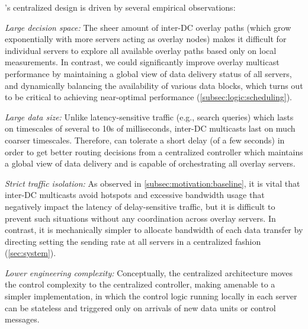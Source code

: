 \name's centralized design is driven by several empirical observations:
\begin{packedenumerate}

\item {\em Large decision space:}
The sheer amount of inter-DC overlay paths (which grow exponentially
with more servers acting as overlay nodes) makes it difficult for 
individual servers to explore all available overlay paths based only 
on local measurements. In contrast, we could significantly improve 
overlay multicast performance by maintaining a global view of data 
delivery status of all servers, and dynamically balancing the 
availability of various data blocks, which turns out to be critical 
to achieving near-optimal performance 
(\Section\ref{subsec:logic:scheduling}).

\item {\em Large data size:}
Unlike latency-sensitive traffic (e.g., search queries) which lasts 
on timescales of several to 10s of milliseconds, inter-DC multicasts 
last on much coarser timescales.
Therefore, \name can tolerate a short delay (of a few seconds) in order
to get better routing decisions from a centralized controller which 
maintains a global view of data delivery and is capable of orchestrating
all overlay servers.

\item {\em Strict traffic isolation:}
As observed in \Section\ref{subsec:motivation:baseline}, it is vital 
that inter-DC multicasts avoid hotspots and excessive bandwidth usage 
that negatively impact the latency of delay-sensitive traffic, but 
it is difficult to prevent such situations without any coordination 
across overlay servers. In contrast, it is mechanically simpler to 
allocate bandwidth of each data transfer by directing setting the 
sending rate at all servers in a centralized fashion 
(\Section\ref{sec:system}).

\item {\em Lower engineering complexity:}
Conceptually, the centralized architecture moves the control 
complexity to the centralized controller, making \name amenable to a
simpler implementation, in which the control logic running locally in
each server can be stateless and triggered only on arrivals of new 
data units or control messages.

\end{packedenumerate}

